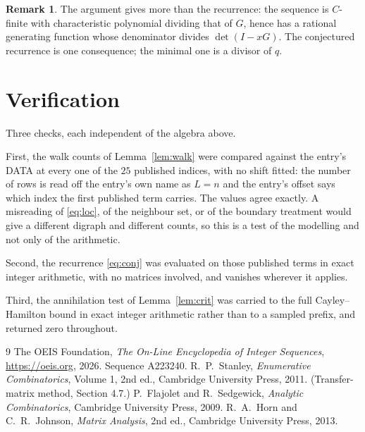 \documentclass[11pt,a4paper]{article}
\theoremstyle{plain}
\theoremstyle{definition}
\newtheorem{remark}[theorem]{Remark}
\begin{document}
\begin{remark}
The argument gives more than the recurrence: the sequence is $C$-finite with characteristic
polynomial dividing that of $G$, hence has a rational generating function whose denominator
divides $\det(I-xG)$. The conjectured recurrence is one consequence; the minimal one is a
divisor of $q$.
\end{remark}

\section{Verification}

Three checks, each independent of the algebra above.

First, the walk counts of Lemma~\ref{lem:walk} were compared against the entry's DATA at
every one of the $25$ published indices, with no shift fitted: the number of rows is
read off the entry's own name as $L=n$ and the entry's offset says which index the first
published term carries. The values agree exactly. A misreading of \eqref{eq:loc}, of the
neighbour set, or of the boundary treatment would give a different digraph and different
counts, so this is a test of the modelling and not only of the arithmetic.

Second, the recurrence \eqref{eq:conj} was evaluated on those published terms in exact
integer arithmetic, with no matrices involved, and vanishes wherever it applies.

Third, the annihilation test of Lemma~\ref{lem:crit} was carried to the full
Cayley--Hamilton bound in exact integer arithmetic rather than to a sampled prefix, and
returned zero throughout.

\begin{thebibliography}{9}
 The OEIS Foundation, \emph{The On-Line Encyclopedia of Integer
Sequences}, \url{https://oeis.org}, 2026. Sequence A223240.
 R.~P.~Stanley, \emph{Enumerative Combinatorics}, Volume 1, 2nd ed.,
Cambridge University Press, 2011. (Transfer-matrix method, Section 4.7.)
 P.~Flajolet and R.~Sedgewick, \emph{Analytic Combinatorics}, Cambridge
University Press, 2009.
 R.~A.~Horn and C.~R.~Johnson, \emph{Matrix Analysis}, 2nd ed., Cambridge
University Press, 2013.
\end{thebibliography}
\end{document}
